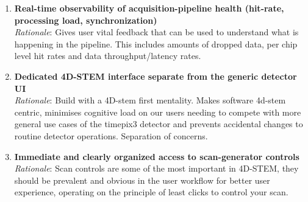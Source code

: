 \documentclass[10pt]{article}
\begin{document}
\begin{enumerate}
        \item \textbf{Real-time observability of acquisition-pipeline health (hit-rate, processing load, synchronization)}\\
        \textit{Rationale}: Gives user vital feedback that can be used to understand what is happening in the pipeline. This includes amounts of dropped data, per chip level hit rates and data throughput/latency rates.
        \item \textbf{Dedicated 4D-STEM interface separate from the generic detector UI}\\
        \textit{Rationale}: Build with a 4D-stem first mentality. Makes software 4d-stem centric, minimises cognitive load on our users needing to compete with more general use cases of the timepix3 detector and prevents accidental changes to routine detector operations. Separation of concerns.
        \item \textbf{Immediate and clearly organized access to scan-generator controls}\\
        \textit{Rationale}: Scan controls are some of the most important in 4D-STEM, they should be prevalent and obvious in the user workflow for better user experience, operating on the principle of least clicks to control your scan.
    \end{enumerate}
\end{document}
